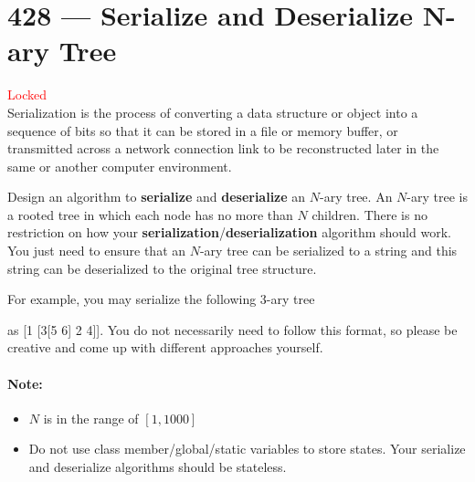 \section{428 --- Serialize and Deserialize N-ary Tree}
\textcolor{red}{Locked}
\\
Serialization is the process of converting a data structure or object into a sequence of bits so that it can be stored in a file or memory buffer, or transmitted across a network connection link to be reconstructed later in the same or another computer environment.
\par
Design an algorithm to \textbf{serialize} and \textbf{deserialize} an $N$-ary tree. An $N$-ary tree is a rooted tree in which each node has no more than $N$ children. There is no restriction on how your \textbf{serialization}/\textbf{deserialization} algorithm should work. You just need to ensure that an $ N $-ary tree can be serialized to a string and this string can be deserialized to the original tree structure.

For example, you may serialize the following 3-ary tree

\begin{figure}[H]
\end{figure}
as [1 [3[5 6] 2 4]]. You do not necessarily need to follow this format, so please be creative and come up with different approaches yourself.

\paragraph{Note:}
\begin{itemize}
\item $ N $ is in the range of $[1, 1000]$
\item Do not use class member/global/static variables to store states. Your serialize and deserialize algorithms should be stateless.
\end{itemize}

